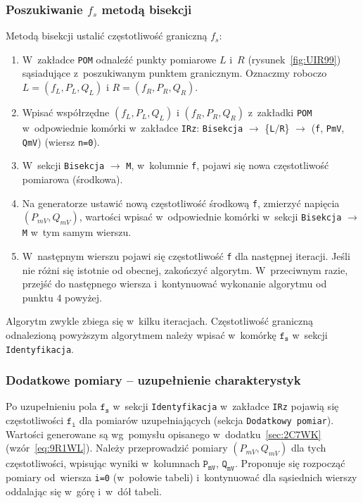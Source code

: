 \documentclass[paper=a4,DIV=12]{lpas}
\begin{document}
\subsubsection{Poszukiwanie $f_s$ metodą bisekcji}
\label{sec:WM5KT}

Metodą bisekcji ustalić częstotliwość graniczną $f_s$:
\begin{enumerate}
  \item W~zakładce \texttt{POM} odnaleźć punkty pomiarowe $L$ i~$R$
    (rysunek~\ref{fig:UIR99}) sąsiadujące z~poszukiwanym punktem granicznym.
    Oznaczmy roboczo $L = (f_L, P_L, Q_L)$ i $R = (f_R, P_R, Q_R)$.
  \item Wpisać współrzędne $(f_L, P_L, Q_L)$ i $(f_R, P_R, Q_R)$ z~zakładki
    \texttt{POM} w~odpowiednie komórki w~zakładce \texttt{IRz}:
    \texttt{Bisekcja} $\rightarrow$ \{\texttt{L}$/$\texttt{R}\} $\rightarrow$
    (\texttt{f}, \texttt{PmV}, \texttt{QmV})  (wiersz \texttt{n=0}).
  \item W~sekcji \texttt{Bisekcja} $\rightarrow$ \texttt{M}, w~kolumnie
    \texttt{f}, pojawi się nowa częstotliwość pomiarowa (środkowa).
  \item Na generatorze ustawić nową częstotliwość środkową \texttt{f}, zmierzyć
    napięcia $(P_{mV}, Q_{mV})$, wartości wpisać w~odpowiednie komórki w~sekcji
    \texttt{Bisekcja} $\rightarrow$ \texttt{M} w~tym samym wierszu.
  \item W~następnym wierszu pojawi się częstotliwość \texttt{f} dla następnej
    iteracji. Jeśli nie różni się istotnie od obecnej, zakończyć algorytm.
    W~przeciwnym razie, przejść do następnego wiersza i~kontynuować wykonanie
    algorytmu od punktu 4 powyżej.
\end{enumerate}

Algorytm zwykle zbiega się w~kilku iteracjach. Częstotliwość graniczną
odnalezioną powyższym algorytmem należy wpisać w~komórkę $\texttt{f}_\texttt{s}$ w~sekcji
\texttt{Identyfikacja}.

\subsubsection{Dodatkowe pomiary -- uzupełnienie charakterystyk}
\label{sec:09H54}

Po uzupełnieniu pola $\texttt{f}_\texttt{s}$ w~sekcji \texttt{Identyfikacja}
w~zakładce \texttt{IRz} pojawią się częstotliwości $\texttt{f}_\texttt{i}$
dla pomiarów uzupełniających (sekcja \texttt{Dodatkowy pomiar}). Wartości
generowane są wg~pomysłu opisanego w~dodatku~\ref{sec:2C7WK}
(wzór~\eqref{eq:9R1WL}). Należy przeprowadzić pomiary $(P_{mV}, Q_{mV})$ dla
tych częstotliwości, wpisując wyniki w~kolumnach $\texttt{P}_\texttt{mV}$,
$\texttt{Q}_\texttt{mV}$. Proponuje się rozpocząć pomiary od~wiersza
\texttt{i=0} (w~połowie tabeli) i~kontynuować dla sąsiednich wierszy oddalając
się w~górę i~w~dół tabeli.
\end{document}

